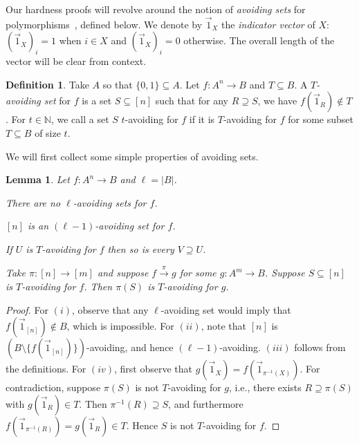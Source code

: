 \documentclass[a4paper,11pt]{article}
\newcommand{\2}{\vec{2}}
\newcommand{\1}{\vec{1}}
\newcommand{\0}{\vec{0}}
\theoremstyle{plain}
\newtheorem{lemma}[theorem]{Lemma}
\theoremstyle{definition}
\newtheorem{definition}[theorem]{Definition}
\begin{document}
Our hardness proofs will revolve around the notion of \emph{avoiding sets} for
polymorphisms~\cite{BBKO21}, defined below. We denote by $\1_X$ the
\emph{indicator vector} of $X$: $(\1_X)_i = 1$ when $i \in X$ and $(\1_X)_i = 0$ otherwise. The overall length of the vector will be clear from context.

\begin{definition}
Take $A$ so that $\{0, 1 \} \subseteq A$. Let $f:A^n\to B$ and $T\subseteq B$.
  A \emph{$T$-avoiding set} for $f$ is a set $S \subseteq [n]$ such that for any
  $R \supseteq S$, we have
  $f(\1_R) \notin T$.
  For $t\in
\mathbb{N}$, we call a set $S$ $t$-avoiding for $f$ if it is $T$-avoiding for
$f$ for some subset $T\subseteq B$ of size $t$. 
\end{definition}

We will first collect some simple properties of avoiding sets.
\begin{lemma}\label{lem:avoidingProperties}
    Let $f : A^n \to B$ and $\ell = |B|$.
    \begin{lemenumerate}
        \item\label{item:noLAvoiding} There are no $\ell$-avoiding sets for $f$.
        \item\label{item:domainAvoiding} $[n]$ is an $(\ell - 1)$-avoiding set for $f$.
        \item\label{item:upwardsClosed} If $U$ is $T$-avoiding for $f$ then so is every $V\supseteq U$.
        \item\label{item:minorPreserving} Take $\pi : [n] \to [m]$ and suppose $f \xrightarrow{\pi} g$ for some $g : A^m \to B$. Suppose $S \subseteq [n]$ is $T$-avoiding for $f$. Then $\pi(S)$ is $T$-avoiding for $g$.
    \end{lemenumerate}
\end{lemma}
\begin{proof}
  For $(i)$, observe that any $\ell$-avoiding set would imply that $f(\1_{[n]})
    \not \in B$, which is impossible. For $(ii)$, note that $[n]$ is $(B \setminus \{
      f(\1_{[n]}) \})$-avoiding, and hence $(\ell - 1)$-avoiding. $(iii)$ follows
    from the definitions.
    For $(iv)$, first observe that $g(\1_X) = f(\1_{\pi^{-1}(X)})$. For
    contradiction, suppose $\pi(S)$ is not $T$-avoiding for $g$, i.e., there exists $R \supseteq \pi(S)$ with $g(\1_R) \in T$. Then $\pi^{-1}(R) \supseteq S$, and furthermore $f(\1_{\pi^{-1}(R)}) = g(\1_R) \in T$. Hence $S$ is not $T$-avoiding for $f$.
\end{proof}
\end{document}
